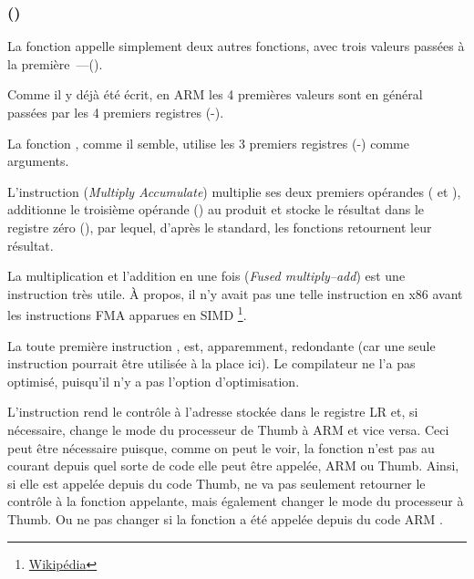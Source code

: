 \subsubsection{\NonOptimizingKeilVI (\ARMMode)}



La fonction \main appelle simplement deux autres fonctions, avec trois valeurs passées
à la première~---(\ttf).

Comme il y déjà été écrit, en ARM les 4 premières valeurs sont en général
passées par les 4 premiers registres (-).

La fonction \ttf, comme il semble, utilise les 3 premiers registres (-) comme arguments. 

L'instruction  (\emph{Multiply Accumulate}) multiplie ses deux premiers opérandes
( et ), additionne le troisième opérande () au produit et stocke
le résultat dans le registre zéro (), par lequel, d'après le standard, les
fonctions retournent leur résultat.

La multiplication et l'addition en une fois (\emph{Fused multiply–add})
est une instruction très utile. À propos, il n'y avait pas une telle instruction en
x86 avant les instructions FMA apparues en SIMD
\footnote{\href{https://en.wikipedia.org/wiki/FMA_instruction_set}{Wikipédia}}.

La toute première instruction , est, apparemment, redondante (car
une seule instruction  pourrait être utilisée à la place ici).
Le compilateur ne l'a pas optimisé, puisqu'il n'y a pas l'option d'optimisation.


L'instruction  rend le contrôle à l'adresse stockée dans le registre \ac{LR}
et, si nécessaire, change le mode du processeur de Thumb à ARM et vice versa.
Ceci peut être nécessaire puisque, comme on peut le voir, la fonction \ttf n'est
pas au courant depuis quel sorte de code elle peut être appelée, ARM ou Thumb.
Ainsi, si elle est appelée depuis du code Thumb,  ne va pas seulement retourner
le contrôle à la fonction appelante, mais également changer le mode du processeur
à Thumb.
Ou ne pas changer si la fonction a été appelée depuis du code ARM .
